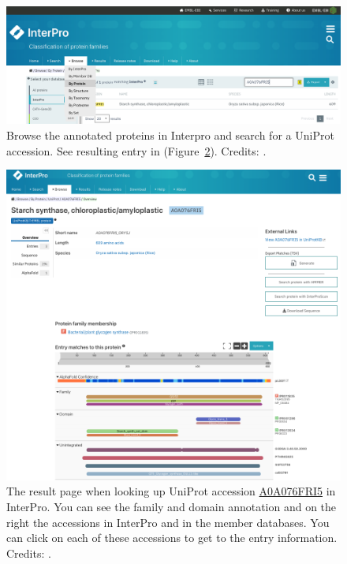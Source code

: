 \begin{figure}[!htbp]
\centering
\includegraphics[width=1\linewidth]{files/interpro-browse-1ae9c2adc4608445ebe1acc3eca4156e.png}
\caption[]{Browse the annotated proteins in Interpro and search for a UniProt accession.
See resulting entry in (Figure~\ref{interpro-prot}). Credits: \cite{interpro_2022}.}
\label{interpro-browse}
\end{figure}

\begin{figure}[!htbp]
\centering
\includegraphics[width=1\linewidth]{files/interpro-prot-21d5398cff123b16fdb878429744a14e.png}
\caption[]{The result page when looking up UniProt accession \href{https://www.ebi.ac.uk/interpro/protein/UniProt/A0A076FRI5/}{A0A076FRI5} in InterPro.
You can see the family and domain annotation and on the right the accessions in InterPro and in the member databases.
You can click on each of these accessions to get to the entry information. Credits: \cite{interpro_2022}.}
\label{interpro-prot}
\end{figure}

